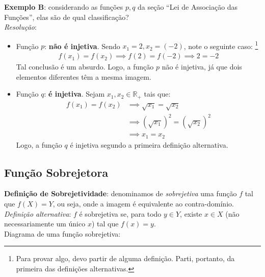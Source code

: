 \documentclass[13pt,letterpaper]{article}
\begin{document}
\textbf{Exemplo B}: considerando as funções $p, q$ da seção \enquote{Lei de Associação das Funções}, elas são de qual classificação? \\
\emph{Resolução}:
\begin{itemize}
    \item Função $p$: \textbf{não é injetiva}. Sendo $x_1 = 2, x_2 = (-2)$, note o seguinte caso: \footnote{Para provar algo, devo partir de alguma definição. Parti, portanto, da primeira das definições alternativas.}
    \begin{align*}
        f(x_1) = f(x_2) \implies
        f(2) = f(-2) \implies
        2 = -2
    \end{align*}
    Tal conclusão é um absurdo. Logo, a função $p$ não é injetiva, já que dois elementos diferentes têm a mesma imagem.
    \item Função $q$: \textbf{é injetiva}. Sejam $x_1, x_2 \in \mathbb{R}_+$ tais que:
    \begin{align*}
        f(x_1) = f(x_2) &\implies
        \sqrt{x_1} = \sqrt{x_2} \\ &\implies
        (\sqrt{x_1})^2 = (\sqrt{x_2})^2 \\ &\implies
        x_1 = x_2
    \end{align*}
    Logo, a função $q$ é injetiva segundo a primeira definição alternativa.
\end{itemize}
\subsection{Função Sobrejetora}
\textbf{Definição de Sobrejetividade}: denominamos de \emph{sobrejetiva} uma função $f$ tal que $f(X) = Y$, ou seja, onde a imagem é equivalente ao contra-domínio. \\
\emph{Definição alternativa}: $f$ é sobrejetiva se, para todo $y \in Y$, existe $x \in X$ (não necessariamente um único $x$) tal que $f(x) = y$. \\

Diagrama de uma função sobrejetiva:

\begin{center}
\end{center}
\end{document}

